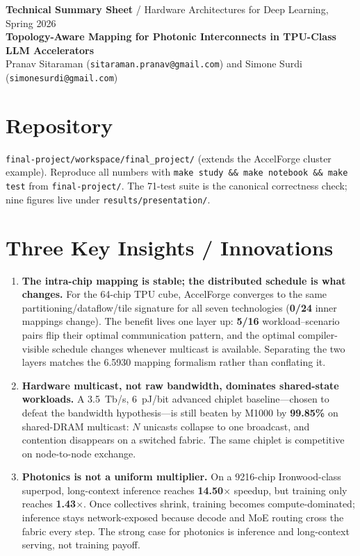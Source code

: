 \documentclass[10pt]{article}
\begin{document}
\begin{center}
{\large\bfseries Technical Summary Sheet}  / Hardware Architectures for Deep Learning, Spring 2026\\[1pt]
\textbf{Topology-Aware Mapping for Photonic Interconnects in TPU-Class LLM Accelerators}\\
Pranav Sitaraman (\texttt{sitaraman.pranav@gmail.com}) \quad and \quad
Simone Surdi (\texttt{simonesurdi@gmail.com})
\end{center}

\section*{Repository}
\texttt{final-project/workspace/final\_project/} (extends the
AccelForge cluster example). Reproduce all numbers with
\texttt{make study \&\& make notebook \&\& make test} from
\texttt{final-project/}. The 71-test suite is the canonical
correctness check; nine figures live under
\texttt{results/presentation/}.

\section*{Three Key Insights / Innovations}
\begin{enumerate}
\item \textbf{The intra-chip mapping is stable; the distributed
schedule is what changes.} For the 64-chip TPU cube, AccelForge
converges to the same partitioning/dataflow/tile signature for all
seven technologies (\textbf{0/24} inner mappings change). The benefit
lives one layer up: \textbf{5/16} workload--scenario pairs flip their
optimal communication pattern, and the optimal compiler-visible
schedule changes whenever multicast is available. Separating the two
layers matches the 6.5930 mapping formalism rather than conflating it.

\item \textbf{Hardware multicast, not raw bandwidth, dominates
shared-state workloads.} A 3.5~Tb/s, 6~pJ/bit advanced chiplet
baseline---chosen to defeat the bandwidth hypothesis---is still
beaten by M1000 by \textbf{99.85\%} on shared-DRAM multicast: $N$
unicasts collapse to one broadcast, and contention disappears on a
switched fabric. The same chiplet is competitive on node-to-node
exchange.

\item \textbf{Photonics is not a uniform multiplier.} On a 9216-chip
Ironwood-class superpod, long-context inference reaches
\textbf{14.50}$\times$ speedup, but training only reaches
\textbf{1.43}$\times$. Once collectives shrink, training becomes
compute-dominated; inference stays network-exposed because decode and
MoE routing cross the fabric every step. The strong case for
photonics is inference and long-context serving, not training payoff.
\end{enumerate}
\end{document}
